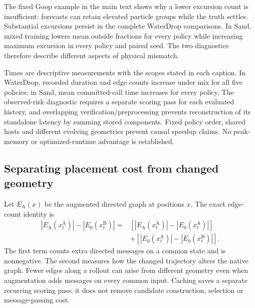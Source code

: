 
The fixed Goop example in the main text shows why a lower excursion count is insufficient: forecasts can retain elevated particle groups while the truth settles. Substantial excursions persist in the complete WaterDrop comparisons. In Sand, mixed training lowers mean outside fractions for every policy while increasing maximum excursion in every policy and paired seed. The two diagnostics therefore describe different aspects of physical mismatch.

Times are descriptive measurements with the scopes stated in each caption. In WaterDrop, recorded duration and edge counts increase under mix for all five policies; in Sand, mean committed-call time increases for every policy. The observed-risk diagnostic requires a separate scoring pass for each evaluated history, and overlapping verification/preprocessing prevents reconstruction of its standalone latency by summing stored components. Fixed policy order, shared hosts and different evolving geometries prevent causal speedup claims. No peak-memory or optimized-runtime advantage is established.

\subsection{Separating placement cost from changed geometry}
Let $E_{\mathrm A}(x)$ be the augmented directed graph at positions $x$. The exact edge-count identity is
\begin{align}
 |E_{\mathrm A}(x_t^{\mathrm A})|-|E_0(x_t^{\mathrm B})|
 ={}&[|E_{\mathrm A}(x_t^{\mathrm A})|-|E_0(x_t^{\mathrm A})|]\nonumber\\
 &+[|E_0(x_t^{\mathrm A})|-|E_0(x_t^{\mathrm B})|].
 \label{eq:decomposition}
\end{align}
The first term counts extra directed messages on a common state and is nonnegative. The second measures how the changed trajectory alters the native graph. Fewer edges along a rollout can arise from different geometry even when augmentation adds messages on every common input. Caching saves a separate recurring scoring pass; it does not remove candidate construction, selection or message-passing cost.


